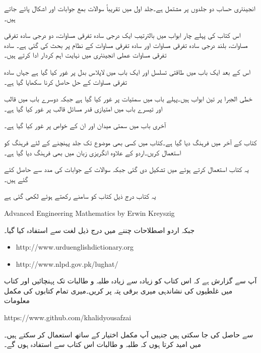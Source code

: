 انجینئری حساب دو جلدوں پر مشتمل ہے۔جلد اول میں تقریباً  سوالات بمع جوابات اور  اشکال  پائے جاتے ہیں۔

اس کتاب کی پہلے چار ابواب میں بالترتیب ایک درجی سادہ تفرقی مساوات، دو درجی سادہ تفرقی مساوات، بلند درجی سادہ تفرقی مساوات  اور سادہ تفرقی مساوات کے نظام پر بحث  کی گئی ہے۔ سادہ تفرقی مساوات عملی انجینئری میں نہایت اہم کردار ادا کرتے ہیں۔ 

اس  کے بعد ایک باب میں طاقتی تسلسل اور ایک باب میں لاپلاس بدل پر  غور کیا گیا ہے جہاں سادہ تفرقی مساوات کے حل حاصل کرنا سکھایا گیا ہے۔ 

خطی الجبرا پر تین ابواب ہیں۔پہلے باب میں سمتیات پر غور کیا گیا ہے جبکہ دوسرے باب میں قالب اور تیسرے باب میں امتیازی قدر مسائل قالب پر غور کیا گیا ہے۔

آخری باب میں سمتی میدان اور ان کے خواص پر غور کیا گیا ہے۔ 

کتاب کے آخر میں فرہنگ دیا گیا ہے۔کتاب میں کسی بھی موضوع تک جلد پہنچنے کے لئے فرہنگ کو استعمال کریں۔اردو کے علاوہ انگریزی زبان میں بھی فرہنگ دیا گیا ہے۔

یہ کتاب  استعمال کرتے ہوئے  میں تشکیل دی گئی جبکہ سوالات کے جوابات  کی مدد سے حاصل کئے گئے ہیں۔

یہ کتاب درج ذیل کتاب کو سامنے رکھتے ہوئے لکھی گئی ہے

{
\begin{otherlanguage}{english}
Advanced Engineering Mathematics by Erwin Kreyszig
\end{otherlanguage}
}

جبکہ اردو اصطلاحات چننے میں درج ذیل لغت سے استفادہ  کیا گیا۔
{
\begin{otherlanguage}{english}
\begin{itemize}
\item
http:/\!\!/www.urduenglishdictionary.org
\item
http:/\!\!/www.nlpd.gov.pk/lughat/
\end{itemize}
\end{otherlanguage}
}
آپ سے گزارش ہے کہ اس کتاب کو زیادہ سے زیادہ طلبہ و طالبات تک پہنچائیں اور کتاب میں غلطیوں کی نشاندہی میری  برقی پتہ پر کریں۔میری تمام کتابوں کی مکمل  معلومات

{
\begin{otherlanguage}{english}
https:/\!\!/www.github.com/khalidyousafzai
\end{otherlanguage}
}

سے حاصل کی جا سکتی ہیں جنہیں آپ مکمل اختیار کے ساتھ استعمال کر سکتے ہیں۔میں امید کرتا ہوں کہ طلبہ و طالبات اس کتاب سے استفادہ ہوں گے۔
\vspace{5mm}

{}


